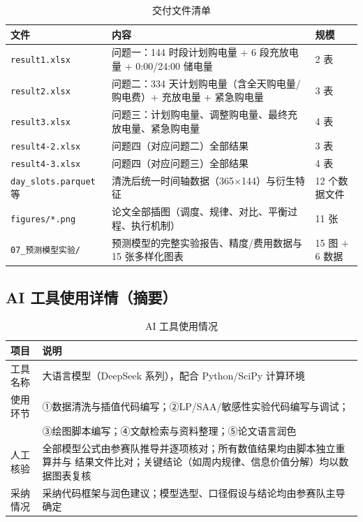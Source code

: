 \begin{table}[htbp]
\centering
\caption{交付文件清单}
\label{tab:deliver}
\small
\begin{tabular}{@{}lll@{}}
\toprule
文件 & 内容 & 规模 \\
\midrule
\texttt{result1.xlsx} & 问题一：144 时段计划购电量 + 6 段充放电量 + 0:00/24:00 储电量 & 2 表 \\
\texttt{result2.xlsx} & 问题二：334 天计划购电量（含全天购电量/购电费）+ 充放电量 + 紧急购电量 & 3 表 \\
\texttt{result3.xlsx} & 问题三：计划购电量、调整购电量、最终充放电量、紧急购电量 & 4 表 \\
\texttt{result4-2.xlsx} & 问题四（对应问题二）全部结果 & 3 表 \\
\texttt{result4-3.xlsx} & 问题四（对应问题三）全部结果 & 4 表 \\
\texttt{day\_slots.parquet} 等 & 清洗后统一时间轴数据（365$\times$144）与衍生特征 & 12 个数据文件 \\
\texttt{figures/*.png} & 论文全部插图（调度、规律、对比、平衡过程、执行机制） & 11 张 \\
\texttt{07\_预测模型实验/} & 预测模型的完整实验报告、精度/费用数据与 15 张多样化图表 & 15 图 $+$ 6 数据 \\
\bottomrule
\end{tabular}
\end{table}

\subsection{AI 工具使用详情（摘要）}

\begin{table}[htbp]
\centering
\caption{AI 工具使用情况}
\label{tab:ai}
\small
\begin{tabularx}{\textwidth}{@{}p{3.2cm}X@{}}
\toprule
项目 & 说明 \\
\midrule
工具名称 & 大语言模型（DeepSeek 系列），配合 Python/SciPy 计算环境 \\
使用环节 & ①数据清洗与插值代码编写；②LP/SAA/敏感性实验代码编写与调试；\\
 & ③绘图脚本编写；④文献检索与资料整理；⑤论文语言润色 \\
人工核验 & 全部模型公式由参赛队推导并逐项核对；所有数值结果均由脚本独立重算并与
结果文件比对；关键结论（如周内规律、信息价值分解）均以数据图表复核 \\
采纳情况 & 采纳代码框架与润色建议；模型选型、口径假设与结论均由参赛队主导确定 \\
\bottomrule
\end{tabularx}
\end{table}
